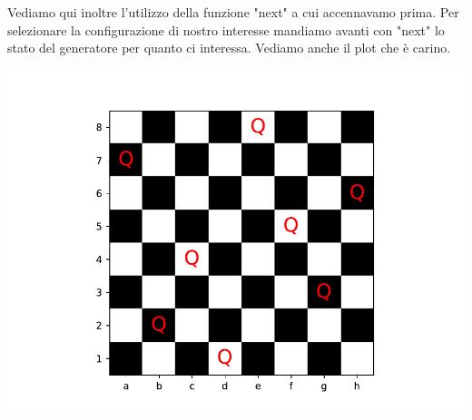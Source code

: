 \documentclass[10pt,a4paper]{article}
\begin{document}
Vediamo qui inoltre l'utilizzo della funzione "next" a cui accennavamo prima. Per selezionare la configurazione di nostro interesse mandiamo avanti con "next" lo stato del generatore per quanto ci interessa. Vediamo anche il plot che è carino.

\begin{center}
\includegraphics[scale=0.7]{img/8Q.pdf}
\end{center}
\end{document}
